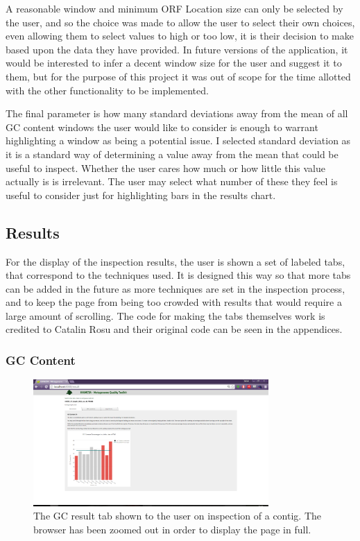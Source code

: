 A reasonable window and minimum ORF Location size can only be selected by the user, and so the choice was made to allow the user to select their own choices, even allowing them to select values to high or too low, it is their decision to make based upon the data they have provided. In future versions of the application, it would be interested to infer a decent window size for the user and suggest it to them, but for the purpose of this project it was out of scope for the time allotted with the other functionality to be implemented.

The final parameter is how many standard deviations away from the mean of all GC content windows the user would like to consider is enough to warrant highlighting a window as being a potential issue. I selected standard deviation as it is a standard way of determining a value away from the mean that could be useful to inspect. Whether the user cares how much or how little this value actually is is irrelevant. The user may select what number of these they feel is useful to consider just for highlighting bars in the results chart.

\subsection{Results}
For the display of the inspection results, the user is shown a set of labeled tabs, that correspond to the techniques used. It is designed this way so that more tabs can be added in the future as more techniques are set in the inspection process, and to keep the page from being too crowded with results that would require a large amount of scrolling. The code for making the tabs themselves work is credited to Catalin Rosu\cite{tabcode} and their original code can be seen in the appendices.

\subsubsection{GC Content}
\begin{figure}[H]
	\centering
\includegraphics[width=0.8\textwidth]{images/ui5}
\caption{The GC result tab shown to the user on inspection of a contig. The browser has been zoomed out in order to display the page in full.}
\end{figure}

